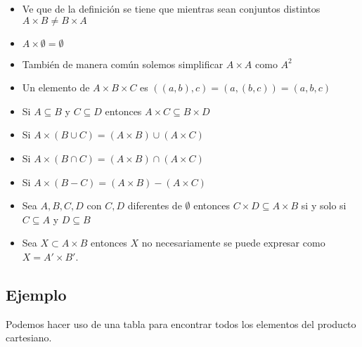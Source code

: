 \documentclass[12pt, fleqn]{report}                             %
\begin{document}
                \begin{itemize}
                    \item Ve que de la definición se tiene que mientras sean conjuntos distintos 
                        $ A \times B \neq B \times A$

                    \item $A \times \emptyset = \emptyset$

                    \item También de manera común solemos simplificar $A \times A$ como $A^2$

                    \item Un elemento de $A \times B \times C$ es $((a,b),c) = (a,(b,c)) = (a,b,c)$

                    \item Si $A \subseteq B$ y $C \subseteq D$ entonces $A \times C \subseteq B \times D$ 

                    \item Si $A \times (B \cup C) = (A \times B) \cup (A \times C)$ 

                    \item Si $A \times (B \cap C) = (A \times B) \cap (A \times C)$ 

                    \item Si $A \times (B - C) = (A \times B) - (A \times C)$

                    \item Sea $A, B, C, D$ con $C, D$ diferentes de $\emptyset$
                        entonces $C \times D \subseteq A \times B$ si y solo si $C \subseteq A$
                        y $D \subseteq B$

                    \item Sea $X \subset A \times B$ entonces $X$ no necesariamente se puede expresar
                    como $X = A' \times B'$.


                \end{itemize}



            \clearpage
            \subsection*{Ejemplo}

                Podemos hacer uso de una tabla para encontrar todos los elementos del producto
                cartesiano.
\end{document}
